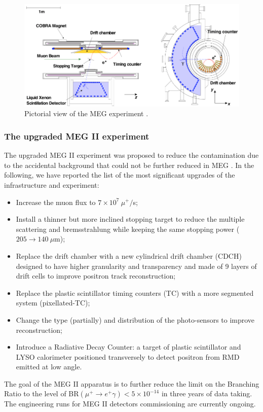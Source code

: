 \documentclass[12pt,a4paper,openright, oneside, titlepage]{book} %
\begin{document}
\begin{figure}[h!]
\centering
\includegraphics[scale=1]{MEG}
\caption[MEG experiment]{Pictorial view of the MEG experiment \cite{Chiappini}\cite{MEG}.}
\label{_MEG}
\end{figure}

\subsubsection{The upgraded MEG II experiment} 

\noindent
The upgraded MEG II experiment was proposed to reduce the contamination due to the accidental background 
that could not be further reduced in MEG \cite{MEG_upgrade} \cite{MEG_II}.
In the following, we have reported the list of the most significant upgrades of the infrastructure and experiment:

\begin{itemize}
\item Increase the muon flux to $7\times10^7\ \mu^+/$s;
\item Install a thinner but more inclined stopping target to reduce the multiple scattering and bremsstrahlung 
while keeping the same stopping power ($205 \rightarrow 140\ \mu$m);
\item Replace the drift chamber with a new cylindrical drift chamber (CDCH) designed  
to have higher granularity and transparency and made of 9 layers of drift cells to improve positron track reconstruction; 
\item Replace the plastic scintillator timing counters (TC) with a more segmented system (pixellated-TC);
\item Change the type (partially) and distribution of the photo-sensors to improve reconstruction;
\item Introduce a Radiative Decay Counter: a target of plastic scintillator and LYSO calorimeter positioned transversely to detect positron from RMD emitted at low angle.
\end{itemize}
The goal of the MEG II apparatus is to further reduce the limit on the Branching Ratio to the level of BR$(\mu^+\rightarrow e^+\gamma)<5\times10^{-14}$ in three years of data taking. 
The engineering runs for MEG II detectors commissioning are currently ongoing.
\end{document}
